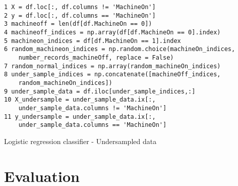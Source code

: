 \documentclass[runningheads]{llncs}
\begin{document}
\noindent
\begin{verbatim}
1 X = df.loc[:, df.columns != 'MachineOn']
2 y = df.loc[:, df.columns == 'MachineOn']
3 machineoff = len(df[df.MachineOn == 0])
4 machineoff_indices = np.array(df[df.MachineOn == 0].index)
5 machineon_indices = df[df.MachineOn == 1].index
6 random_machineon_indices = np.random.choice(machineOn_indices, 
    number_records_machineOff, replace = False)
7 random_normal_indices = np.array(random_machineOn_indices)
8 under_sample_indices = np.concatenate([machineOff_indices,
    random_machineOn_indices])
9 under_sample_data = df.iloc[under_sample_indices,:]
10 X_undersample = under_sample_data.ix[:, 
    under_sample_data.columns != 'MachineOn']
11 y_undersample = under_sample_data.ix[:, 
    under_sample_data.columns == 'MachineOn']
\end{verbatim}
\noindent






Logistic regression classifier - Undersampled data



\fi




\iffalse

evaluate the model with some performance measure 
consult the domain expert
Takt time is the average time between the start of production of one unit and the start of production of the next unit, when these production starts are set to match the rate of customer demand. For example, if a customer wants 10 units per week, then, given a 40-hour work week and steady flow through the production line, the average time between production starts should be 4 hours (actually less than that in order to account for things like machine downtime and scheduled paid employee breaks), yielding 10 units produced per week.
\section {Near Real-time Dashboard}
\label{sec:dashboard}
\fi

\iffalse

nadeem
\fi

\section {Evaluation}
\label{sec:evaluation}
\end{document}
